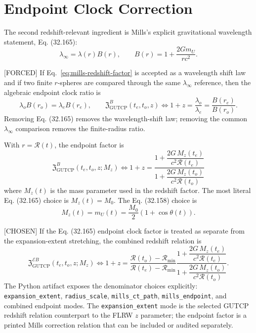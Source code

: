 \documentclass[11pt]{article}
\newcommand{\RG}{\mathcal{R}}
\newcommand{\EG}{\mathcal{E}}
\newcommand{\ZRel}{\mathfrak{Z}_{\mathrm{GUTCP}}}
\begin{document}
\section*{Endpoint Clock Correction}

The second redshift-relevant ingredient is Mills's explicit gravitational
wavelength statement, Eq. (32.165):
\begin{equation}
\lambda_\infty=\lambda(r)B(r),
\qquad
B(r)=1+\frac{2Gm_U}{rc^2}.
\label{eq:mills-redshift-factor}
\end{equation}

[FORCED] If Eq.~\eqref{eq:mills-redshift-factor} is accepted as a wavelength
shift law and if two finite \(r\)-spheres are compared through the same
\(\lambda_\infty\) reference, then the algebraic endpoint clock ratio is
\begin{equation}
\lambda_o B(r_o)=\lambda_e B(r_e),
\qquad
\ZRel^B(t_e,t_o,z)\Longleftrightarrow
1+z=\frac{\lambda_o}{\lambda_e}
=\frac{B(r_e)}{B(r_o)}.
\end{equation}
Removing Eq. (32.165) removes the wavelength-shift law; removing the common
\(\lambda_\infty\) comparison removes the finite-radius ratio.

With \(r=\RG(t)\), the endpoint factor is
\begin{equation}
\boxed{
\ZRel^{B}(t_e,t_o,z;M_z)
\Longleftrightarrow
1+z
=
\frac{
1+\dfrac{2G\,M_z(t_e)}{c^2\RG(t_e)}
}{
1+\dfrac{2G\,M_z(t_o)}{c^2\RG(t_o)}
}
}
\label{eq:zgutcp-endpoint}
\end{equation}
where \(M_z(t)\) is the mass parameter used in the redshift factor.  The most
literal Eq. (32.165) choice is \(M_z(t)=M_0\).  The Eq. (32.158) choice is
\begin{equation}
M_z(t)=m_U(t)=\frac{M_0}{2}\left(1+\cos\theta(t)\right).
\end{equation}

[CHOSEN] If the Eq. (32.165) endpoint clock factor is treated as separate from
the expansion-extent stretching, the combined redshift relation is
\begin{equation}
\boxed{
\ZRel^{\EG B}(t_e,t_o,z;M_z)
\Longleftrightarrow
1+z
=
\frac{\RG(t_o)-\RG_{\min}}{\RG(t_e)-\RG_{\min}}
\frac{
1+\dfrac{2G\,M_z(t_e)}{c^2\RG(t_e)}
}{
1+\dfrac{2G\,M_z(t_o)}{c^2\RG(t_o)}
}.
}
\label{eq:zgutcp-combined}
\end{equation}
The Python artifact exposes the denominator choices explicitly:
\texttt{expansion\_extent}, \texttt{radius\_scale}, \texttt{mills\_ct\_path},
\texttt{mills\_endpoint}, and combined endpoint modes.  The
\texttt{expansion\_extent} mode is the selected GUTCP redshift relation
counterpart to the FLRW \(z\) parameter; the endpoint factor is a printed Mills
correction relation that can be included or audited separately.
\end{document}
